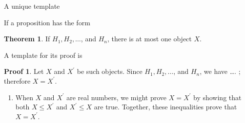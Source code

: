 \documentclass[fleqn]{beamer}
\theoremstyle{definition}
\newtheorem{myth}{Theorem}
\newtheorem{myproof}{Proof}
\begin{document}
\begin{frame}{A unique template}

If a proposition has the form
\begin{myth} If \(H_1, H_2, \dots\), and \( H_n\), there is at most one object \(X\). \end{myth}

A template for its proof is

\begin{myproof} Let \(X\) and \(X^\prime\) be such objects. Since \(H_1, H_2, \dots\), and \( H_n\), we have \dots.  ; therefore \(X = X^\prime\). \end{myproof} 



\begin{enumerate}

\item When \(X\) and \(X^\prime \) are real numbers, we might prove \(X = X^\prime\) by showing that both \(X \leq X^\prime\) and  \(X^\prime  \leq X\) are true. Together,
these inequalities prove that  \(X = X^\prime\).
\end{enumerate}

\end{frame}
\end{document}
